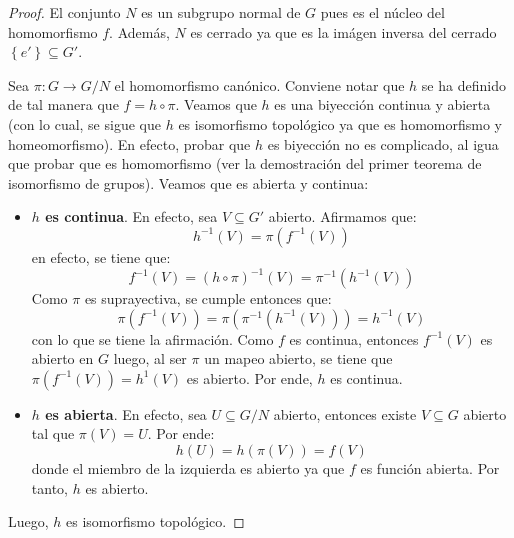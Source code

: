 \documentclass[12pt]{report}
\theoremstyle{largebreak}
\newcommand{\cf}[3]{\ensuremath{#1:#2\rightarrow#3}}
\begin{document}
    \begin{proof}
        El conjunto $N$ es un subgrupo normal de $G$ pues es el núcleo del homomorfismo $f$. Además, $N$ es cerrado ya que es la imágen inversa del cerrado $\left\{e'\right\}\subseteq G'$.

        Sea $\cf{\pi}{G}{G/N}$ el homomorfismo canónico. Conviene notar que $h$ se ha definido de tal manera que $f=h\circ\pi$. Veamos que $h$ es una biyección continua y abierta (con lo cual, se sigue que $h$ es isomorfismo topológico ya que es homomorfismo y homeomorfismo). En efecto, probar que $h$ es biyección no es complicado, al igua que probar que es homomorfismo (ver la demostración del primer teorema de isomorfismo de grupos). Veamos que es abierta y continua:
        \begin{itemize}
            \item \textbf{$h$ es continua}. En efecto, sea $V\subseteq G'$ abierto. Afirmamos que:
            \begin{equation}
                h^{-1}(V)=\pi(f^{-1}(V))
            \end{equation}
            en efecto, se tiene que:
            \begin{equation*}
                f^{-1}(V)=(h\circ \pi)^{-1}(V)=\pi^{-1}(h^{-1}(V))
            \end{equation*}
            Como $\pi$ es suprayectiva, se cumple entonces que:
            \begin{equation*}
                \pi(f^{-1}(V))=\pi(\pi^{-1}(h^{-1}(V)))=h^{-1}(V)
            \end{equation*}
            con lo que se tiene la afirmación. Como $f$ es continua, entonces $f^{-1}(V)$ es abierto en $G$ luego, al ser $\pi$ un mapeo abierto, se tiene que $\pi(f^{-1}(V))=h^{1}(V)$ es abierto. Por ende, $h$ es continua.
            \item \textbf{$h$ es abierta}. En efecto, sea $U\subseteq G/N$ abierto, entonces existe $V\subseteq G$ abierto tal que $\pi(V)=U$. Por ende:
            \begin{equation*}
                h(U)=h(\pi(V))=f(V)
            \end{equation*}
            donde el miembro de la izquierda es abierto ya que $f$ es función abierta. Por tanto, $h$ es abierto.
        \end{itemize}
        Luego, $h$ es isomorfismo topológico.
    \end{proof}

\end{document}

